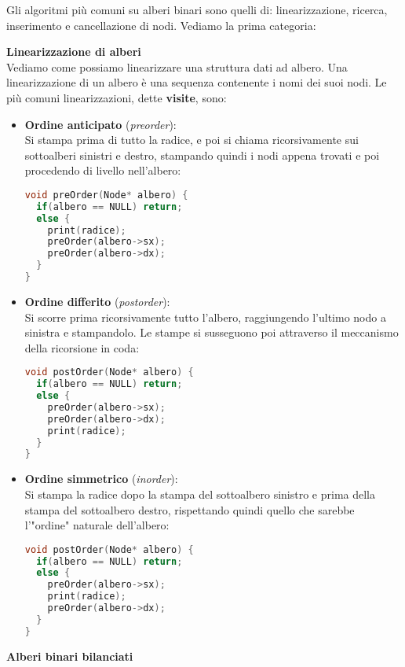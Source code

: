 \documentclass[a4paper,12pt]{article}
\begin{document}
Gli algoritmi più comuni su alberi binari sono quelli di: linearizzazione, ricerca, inserimento e cancellazione di nodi.
Vediamo la prima categoria:
\par\smallskip
\textbf{Linearizzazione di alberi} \\
Vediamo come possiamo linearizzare una struttura dati ad albero. Una linearizzazione di un albero
è una sequenza contenente i nomi dei suoi nodi. Le più comuni linearizzazioni, dette \textbf{visite}, sono:
\begin{itemize}
  \item \textbf{Ordine anticipato} (\textit{preorder}): \\
    Si stampa prima di tutto la radice, e poi si chiama ricorsivamente sui sottoalberi sinistri e destro, stampando
    quindi i nodi appena trovati e poi procedendo di livello nell'albero:
    \begin{lstlisting}[language=C++]
void preOrder(Node* albero) {
  if(albero == NULL) return;
  else {
    print(radice);
    preOrder(albero->sx);
    preOrder(albero->dx);
  }
}
    \end{lstlisting}
  \item \textbf{Ordine differito} (\textit{postorder}): \\
  Si scorre prima ricorsivamente tutto l'albero, raggiungendo l'ultimo nodo a sinistra e stampandolo. Le stampe
  si susseguono poi attraverso il meccanismo della ricorsione in coda:
  \begin{lstlisting}[language=C++]
void postOrder(Node* albero) {
  if(albero == NULL) return;
  else {
    preOrder(albero->sx);
    preOrder(albero->dx);
    print(radice);
  }
}
    \end{lstlisting}
  \item \textbf{Ordine simmetrico} (\textit{inorder}): \\
    Si stampa la radice dopo la stampa del sottoalbero sinistro e prima della stampa del sottoalbero destro,
    rispettando quindi quello che sarebbe l'"ordine" naturale dell'albero:
    \begin{lstlisting}[language=C++]
void postOrder(Node* albero) {
  if(albero == NULL) return;
  else {
    preOrder(albero->sx);
    print(radice);
    preOrder(albero->dx);
  }
}
    \end{lstlisting}
\end{itemize}
\par\smallskip
\par\smallskip
\textbf{Alberi binari bilanciati} \\
\end{document}
